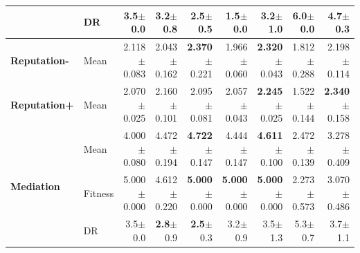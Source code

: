 \begin{table}[htbp]
{\begin{tabular}{ll||r|rrrrrr}
 & DR & 3.5{\scriptsize\color{black!60}$\pm$0.0} & 3.2{\scriptsize\color{black!60}$\pm$0.8} & \textbf{2.5}{\scriptsize\color{black!60}$\pm$0.5} & \textbf{1.5}{\scriptsize\color{black!60}$\pm$0.0} & 3.2{\scriptsize\color{black!60}$\pm$1.0} & \textcolor{black!60}{6.0}{\scriptsize\color{black!60}$\pm$0.0} & \textcolor{black!60}{4.7}{\scriptsize\color{black!60}$\pm$0.3} \\
\midrule
\textbf{Reputation-} & Mean & \cellcolor[HTML]{8ABEDC} 2.118{\scriptsize\color{black!60}$\pm$0.083} & 2.043{\scriptsize\color{black!60}$\pm$0.162} & \textbf{2.370}{\scriptsize\color{black!60}$\pm$0.221} & 1.966{\scriptsize\color{black!60}$\pm$0.060} & \textbf{2.320}{\scriptsize\color{black!60}$\pm$0.043} & \textcolor{black!60}{1.812}{\scriptsize\color{black!60}$\pm$0.288} & 2.198{\scriptsize\color{black!60}$\pm$0.114} \\
\midrule
\textbf{Reputation+} & Mean & \cellcolor[HTML]{85BBDA} 2.070{\scriptsize\color{black!60}$\pm$0.025} & 2.160{\scriptsize\color{black!60}$\pm$0.101} & 2.095{\scriptsize\color{black!60}$\pm$0.081} & 2.057{\scriptsize\color{black!60}$\pm$0.043} & \textbf{2.245}{\scriptsize\color{black!60}$\pm$0.025} & \textcolor{black!60}{1.522}{\scriptsize\color{black!60}$\pm$0.144} & \textbf{2.340}{\scriptsize\color{black!60}$\pm$0.158} \\
\midrule
\multirow{3}{*}{\textbf{Mediation}} & Mean & \cellcolor[HTML]{FBEFD4} 4.000{\scriptsize\color{black!60}$\pm$0.080} & 4.472{\scriptsize\color{black!60}$\pm$0.194} & \textbf{4.722}{\scriptsize\color{black!60}$\pm$0.147} & 4.444{\scriptsize\color{black!60}$\pm$0.147} & \textbf{4.611}{\scriptsize\color{black!60}$\pm$0.100} & \textcolor{black!60}{2.472}{\scriptsize\color{black!60}$\pm$0.139} & \textcolor{black!60}{3.278}{\scriptsize\color{black!60}$\pm$0.409} \\
 & Fitness & \cellcolor[HTML]{F2CF80} 5.000{\scriptsize\color{black!60}$\pm$0.000} & 4.612{\scriptsize\color{black!60}$\pm$0.220} & \textbf{5.000}{\scriptsize\color{black!60}$\pm$0.000} & \textbf{5.000}{\scriptsize\color{black!60}$\pm$0.000} & \textbf{5.000}{\scriptsize\color{black!60}$\pm$0.000} & \textcolor{black!60}{2.273}{\scriptsize\color{black!60}$\pm$0.573} & \textcolor{black!60}{3.070}{\scriptsize\color{black!60}$\pm$0.486} \\
 & DR & 3.5{\scriptsize\color{black!60}$\pm$0.0} & \textbf{2.8}{\scriptsize\color{black!60}$\pm$0.9} & \textbf{2.5}{\scriptsize\color{black!60}$\pm$0.3} & 3.2{\scriptsize\color{black!60}$\pm$0.9} & 3.5{\scriptsize\color{black!60}$\pm$1.3} & \textcolor{black!60}{5.3}{\scriptsize\color{black!60}$\pm$0.7} & 3.7{\scriptsize\color{black!60}$\pm$1.1} \\

\end{tabular}}
\end{table}
